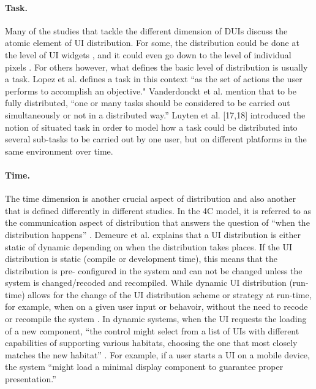 \paragraph{Task.} Many of the studies that tackle the different dimension of
DUIs discuss the atomic element of UI distribution. For some, the distribution
could be done at the level of UI widgets \cite{vanderdonckt2010distributed}, and
it could even go down to the level of individual pixels \cite{demeure20084c}.
For others however, what defines the basic level of distribution is usually a
task. Lopez et al. \cite{lopez2011formal} defines a task in this context ``as the
set of actions the user performs to accomplish an objective."
Vanderdonckt et al. \cite{vanderdonckt2010distributed} mention that 
to be fully distributed, ``one or many tasks should be considered to be
carried out simultaneously or not in a distributed way.''  Luyten et al. [17,18] introduced the notion of situated task in
order to model how a task could be distributed into several sub-tasks to be
carried out by one user, but on different platforms in the same environment
over time.\\

\paragraph{Time.} The time dimension is another crucial aspect of distribution
and also another that is defined differently in different studies. In the 4C
model, it is referred to as the communication aspect of distribution that
answers the question of ``when the distribution happens'' \cite{demeure20084c}.
Demeure et al. explains that a UI distribution is either static of dynamic
depending on when the distribution takes places. If the UI distribution is
static (compile or development time), this means that the distribution is pre-
configured in the system and can not be changed unless the system is
changed/recoded and recompiled. While dynamic UI distribution (run-time) allows
for the change of the UI distribution scheme or strategy at run-time, for
example, when on a given user input or behavoir, without the need to recode or
recompile the system \cite{demeure20084c}. In dynamic systems,
when the UI requests the loading of a new component, ``the control might select
from a list of UIs with different capabilities of supporting various habitats,
choosing the one that most closely matches the new habitat'' \cite{demeure20084c}.
For example, if a user starts a UI on a mobile device, the system ``might
load a minimal display component to guarantee proper presentation.'' \cite{demeure20084c}\\


